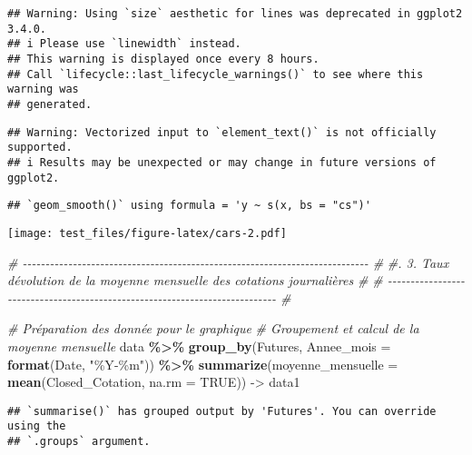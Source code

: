 \documentclass[
]{article}
\newenvironment{Shaded}{\begin{snugshade}}{\end{snugshade}}
\newcommand{\AttributeTok}[1]{\textcolor[rgb]{0.13,0.29,0.53}{#1}}
\newcommand{\CommentTok}[1]{\textcolor[rgb]{0.56,0.35,0.01}{\textit{#1}}}
\newcommand{\ConstantTok}[1]{\textcolor[rgb]{0.56,0.35,0.01}{#1}}
\newcommand{\FunctionTok}[1]{\textcolor[rgb]{0.13,0.29,0.53}{\textbf{#1}}}
\newcommand{\NormalTok}[1]{#1}
\newcommand{\OtherTok}[1]{\textcolor[rgb]{0.56,0.35,0.01}{#1}}
\newcommand{\SpecialCharTok}[1]{\textcolor[rgb]{0.81,0.36,0.00}{\textbf{#1}}}
\newcommand{\StringTok}[1]{\textcolor[rgb]{0.31,0.60,0.02}{#1}}
\begin{document}
\begin{verbatim}
## Warning: Using `size` aesthetic for lines was deprecated in ggplot2 3.4.0.
## i Please use `linewidth` instead.
## This warning is displayed once every 8 hours.
## Call `lifecycle::last_lifecycle_warnings()` to see where this warning was
## generated.
\end{verbatim}

\begin{verbatim}
## Warning: Vectorized input to `element_text()` is not officially supported.
## i Results may be unexpected or may change in future versions of ggplot2.
\end{verbatim}

\begin{verbatim}
## `geom_smooth()` using formula = 'y ~ s(x, bs = "cs")'
\end{verbatim}

\texttt{[image: test\_files/figure-latex/cars-2.pdf]}

\begin{Shaded}
\begin{Highlighting}[]
\CommentTok{\# {-}{-}{-}{-}{-}{-}{-}{-}{-}{-}{-}{-}{-}{-}{-}{-}{-}{-}{-}{-}{-}{-}{-}{-}{-}{-}{-}{-}{-}{-}{-}{-}{-}{-}{-}{-}{-}{-}{-}{-}{-}{-}{-}{-}{-}{-}{-}{-}{-}{-}{-}{-}{-}{-}{-}{-}{-}{-}{-}{-}{-}{-}{-}{-}{-}{-}{-}{-}{-}{-}{-}{-}{-}{-}{-}{-} \#}
\CommentTok{\#.   3. Taux d\textquotesingle{}évolution de la moyenne mensuelle des cotations journalières    \# }
\CommentTok{\# {-}{-}{-}{-}{-}{-}{-}{-}{-}{-}{-}{-}{-}{-}{-}{-}{-}{-}{-}{-}{-}{-}{-}{-}{-}{-}{-}{-}{-}{-}{-}{-}{-}{-}{-}{-}{-}{-}{-}{-}{-}{-}{-}{-}{-}{-}{-}{-}{-}{-}{-}{-}{-}{-}{-}{-}{-}{-}{-}{-}{-}{-}{-}{-}{-}{-}{-}{-}{-}{-}{-}{-}{-}{-}{-}{-} \#}

\CommentTok{\# Préparation des donnée pour le graphique}
\CommentTok{\# Groupement et calcul de la moyenne mensuelle}
\NormalTok{data }\SpecialCharTok{\%\textgreater{}\%}
  \FunctionTok{group\_by}\NormalTok{(Futures, }\AttributeTok{Annee\_mois =} \FunctionTok{format}\NormalTok{(Date, }\StringTok{"\%Y{-}\%m"}\NormalTok{)) }\SpecialCharTok{\%\textgreater{}\%}
  \FunctionTok{summarize}\NormalTok{(}\AttributeTok{moyenne\_mensuelle =} \FunctionTok{mean}\NormalTok{(Closed\_Cotation, }\AttributeTok{na.rm =} \ConstantTok{TRUE}\NormalTok{)) }\OtherTok{{-}\textgreater{}}\NormalTok{ data1}
\end{Highlighting}
\end{Shaded}

\begin{verbatim}
## `summarise()` has grouped output by 'Futures'. You can override using the
## `.groups` argument.
\end{verbatim}
\end{document}
